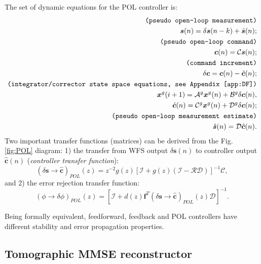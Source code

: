 The set of dynamic equations for the POL controller is:
\begin{align}
  \texttt{(pseudo open-loop measurement)} \nonumber \\
	\bm{s}(n) = \delta \bm{s}(n-k) + \hat{\bm{s}}(n); \label{eq:POL-meas} \\
	\texttt{(pseudo open-loop command)} \nonumber \\
  \bm{c}(n) = \mathcal{C} \bm{s}(n); \label{eq:POL-est} \\
  \texttt{(command increment)} \nonumber \\
  \delta \bm{c} = \bm{c}(n) - \hat{\bm{c}}(n); \\
  \texttt{(integrator/corrector state space equations, see Appendix
  \ref{app:DF})} \nonumber \\
  \bm{x}^{g}(i+1) = \mathcal{A}^{g} \bm{x}^{g}(n) +
                    \mathcal{B}^{g} \delta \bm{c}(n), \\
  \hat{\bm{c}}(n) = \mathcal{C}^{g} \bm{x}^{g}(n) +
                    \mathcal{D}^{g} \delta \bm{c}(n); \\
  \texttt{(pseudo open-loop measurement estimate)} \nonumber \\
  \hat{\bm{s}}(n) = \mathcal{D} \hat{\bm{c}}(n).
\end{align}
Two important transfer functions (matrices) can be derived from the Fig.
\ref{fig:POL} diagram: 1) the transfer from WFS output $\delta \bm{s}(n)$ to
controller output $\hat{\bm{c}}(n)$ (\emph{controller transfer function}):
\begin{equation} \label{eq:WFS-to-Control}
	(\delta \bm{s} \rightarrow \hat{\bm{c}})_{POL}(z) =
	z^{-2} g(z) \left[ \mathcal{I} +
	g(z) (\mathcal{I}-\mathcal{RD}) \right]^{-1} \mathcal{C},
\end{equation}
and 2) the error rejection transfer function:
\begin{equation} \label{eq:phase-to-error}
	(\phi \rightarrow \delta \phi)_{POL}(z) =
	\left[ \mathcal{I} + d(z) \bm{f}^{T}
	(\delta \bm{s} \rightarrow \hat{\bm{c}})_{POL}(z) \mathcal{D} \right]^{-1}.
\end{equation}

Being formally equivalent, feedforward, feedback and POL controllers have
different stability and error propagation properties.

\subsection{Tomographic MMSE reconstructor}
\label{subsec:MMSE-tomo}

